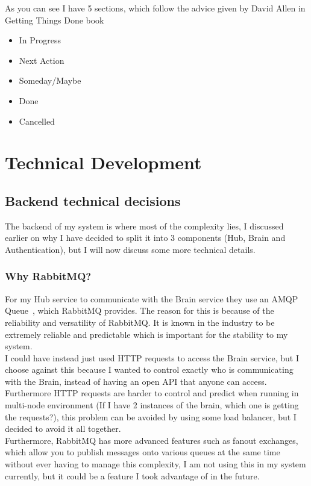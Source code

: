 \documentclass[titlepage]{article}
\begin{document}
As you can see I have 5 sections, which follow the advice given by David Allen in Getting Things Done book~\cite{gtd}

\begin{itemize}
  \item In Progress
  \item Next Action
  \item Someday/Maybe
  \item Done
  \item Cancelled
\end{itemize}

\pagebreak
\section{Technical Development}
\subsection{Backend technical decisions}
The backend of my system is where most of the complexity lies, I discussed earlier on why I have decided to split it into 3 components (Hub, Brain and Authentication), but I will now discuss some more technical details.

\subsubsection{Why RabbitMQ?}
\label{rabbitmq_comms}
For my Hub service to communicate with the Brain service they use an AMQP Queue~\cite{amqp}, which RabbitMQ provides. The reason for this is because of the reliability and versatility of RabbitMQ. It is known in the industry to be extremely reliable and predictable which is important for the stability to my system. \\

I could have instead just used HTTP requests to access the Brain service, but I choose against this because I wanted to control exactly who is communicating with the Brain, instead of having an open API that anyone can access. Furthermore HTTP requests are harder to control and predict when running in multi-node environment (If I have 2 instances of the brain, which one is getting the requests?), this problem can be avoided by using some load balancer, but I decided to avoid it all together. \\

Furthermore, RabbitMQ has more advanced features such as fanout exchanges, which allow you to publish messages onto various queues at the same time without ever having to manage this complexity, I am not using this in my system currently, but it could be a feature I took advantage of in the future.
\end{document}
